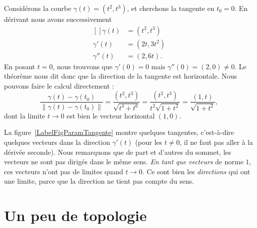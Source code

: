 \begin{example}
	Considérons la courbe \( \gamma(t)=(t^2,t^3)\), et cherchons la tangente en \( t_0=0\). En dérivant nous avons successivement
	\begin{equation}
		\begin{aligned}[]
			\gamma(t)   & =(t^2,t^3) \\
			\gamma'(t)  & =(2t,3t^2) \\
			\gamma''(t) & =(2,6t).
		\end{aligned}
	\end{equation}
	En posant \( t=0\), nous trouvons que \( \gamma'(0)=0\) mais \( \gamma''(0)=(2,0)\neq 0\). Le théorème nous dit donc que la direction de la tangente est horizontale. Nous pouvons faire le calcul directement :
	\begin{equation}
		\frac{ \gamma(t)-\gamma(t_0) }{ \| \gamma(t)-\gamma(t_0) \| }=\frac{ (t^2,t^3) }{ \sqrt{t^4+t^6} }=\frac{ (t^2,t^3) }{ t^2\sqrt{1+t^2} }=\frac{ (1,t) }{ \sqrt{1+t^2} },
	\end{equation}
	dont la limite \( t\to 0\) est bien le vecteur horizontal \( (1,0)\).

	La figure~\ref{LabelFigParamTangente} montre quelques tangentes,
	c'est-à-dire quelques vecteurs dans la direction \( \gamma'(t)\) (pour les \( t\neq 0\), il ne faut pas aller à la dérivée seconde). Nous remarquons que de part et d'autres du sommet, les vecteurs ne sont pas dirigés dans le même sens. \emph{En tant que vecteurs} de norme \( 1\), ces vecteurs n'ont pas de limites quand \( t\to 0\). Ce sont bien les \emph{directions} qui ont une limite, parce que la direction ne tient pas compte du sens.
	\newcommand{\CaptionFigParamTangente}{Quelques tangentes de la courbe \( \gamma(t)=(t^2,t^3)\).}
	

\end{example}

\section{Un peu de topologie}


